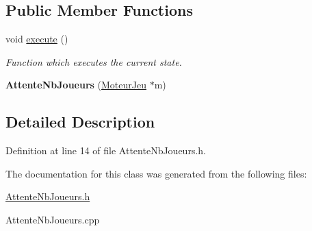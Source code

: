 \subsection*{Public Member Functions}
\begin{DoxyCompactItemize}
\item 
\hypertarget{class_attente_nb_joueurs_ad762d4a5a9f9c2cb0ebd594759a7d334}{
void \hyperlink{class_attente_nb_joueurs_ad762d4a5a9f9c2cb0ebd594759a7d334}{execute} ()}
\label{class_attente_nb_joueurs_ad762d4a5a9f9c2cb0ebd594759a7d334}

\begin{DoxyCompactList}\small\item\em Function which executes the current state. \item\end{DoxyCompactList}\item 
\hypertarget{class_attente_nb_joueurs_a8e7af1c4b8fadffa1f368a65a12e5a6e}{
{\bfseries AttenteNbJoueurs} (\hyperlink{class_moteur_jeu}{MoteurJeu} $\ast$m)}
\label{class_attente_nb_joueurs_a8e7af1c4b8fadffa1f368a65a12e5a6e}

\end{DoxyCompactItemize}


\subsection{Detailed Description}


Definition at line 14 of file AttenteNbJoueurs.h.



The documentation for this class was generated from the following files:\begin{DoxyCompactItemize}
\item 
\hyperlink{_attente_nb_joueurs_8h}{AttenteNbJoueurs.h}\item 
AttenteNbJoueurs.cpp\end{DoxyCompactItemize}
